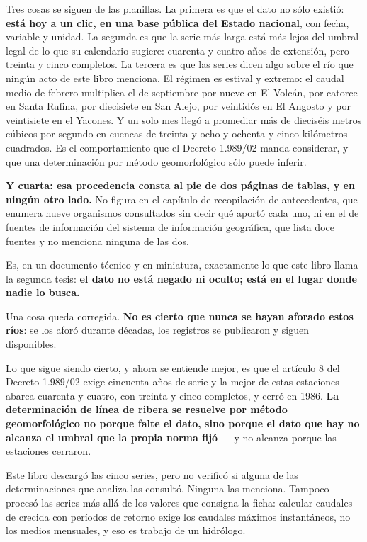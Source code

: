 Tres cosas se siguen de las planillas. La primera es que el dato no sólo existió: \textbf{está hoy a un clic, en una base pública del Estado nacional}, con fecha, variable y unidad. La segunda es que la serie más larga está más lejos del umbral legal de lo que su calendario sugiere: cuarenta y cuatro años de extensión, pero treinta y cinco completos. La tercera es que las series dicen algo sobre el río que ningún acto de este libro menciona. El régimen es estival y extremo: el caudal medio de febrero multiplica el de septiembre por nueve en El Volcán, por catorce en Santa Rufina, por diecisiete en San Alejo, por veintidós en El Angosto y por veintisiete en el Yacones. Y un solo mes llegó a promediar más de dieciséis metros cúbicos por segundo en cuencas de treinta y ocho y ochenta y cinco kilómetros cuadrados. Es el comportamiento que el Decreto 1.989/02 manda considerar, y que una determinación por método geomorfológico sólo puede inferir.

\textbf{Y cuarta: esa procedencia consta al pie de dos páginas de tablas, y en ningún otro
lado.} No figura en el capítulo de recopilación de antecedentes, que enumera nueve organismos
consultados sin decir qué aportó cada uno, ni en el de fuentes de información del sistema de
información geográfica, que lista doce fuentes y no menciona ninguna de las dos.

Es, en un documento técnico y en miniatura, exactamente lo que este libro llama la segunda
tesis: \textbf{el dato no está negado ni oculto; está en el lugar donde nadie lo busca.}

\begin{cautela}
Una cosa queda corregida. \textbf{No es cierto que nunca se hayan
aforado estos ríos}: se los aforó durante décadas, los registros se publicaron y siguen
disponibles.

Lo que sigue siendo cierto, y ahora se entiende mejor, es que el artículo 8 del Decreto
1.989/02 exige cincuenta años de serie y la mejor de estas estaciones abarca cuarenta y cuatro, con treinta y cinco completos, y cerró en 1986. \textbf{La determinación de línea de ribera se resuelve por método
geomorfológico no porque falte el dato, sino porque el dato que hay no alcanza el umbral que
la propia norma fijó} --- y no alcanza porque las estaciones cerraron.

Este libro descargó las cinco series, pero no verificó si alguna de las determinaciones que analiza las consultó. Ninguna las menciona. Tampoco procesó las series más allá de los valores que consigna la ficha: calcular caudales de crecida con períodos de retorno exige los caudales máximos instantáneos, no los medios mensuales, y eso es trabajo de un hidrólogo.
\end{cautela}


